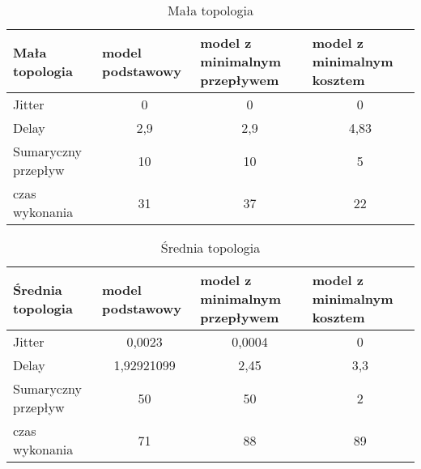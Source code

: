 \begin{table}[!h]
\centering
\caption{Mała topologia}
\label{my-label}
\begin{tabular}{|l|c|c|c|}
\hline
Mała topologia      & \multicolumn{1}{l|}{model podstawowy} & \multicolumn{1}{l|}{model z minimalnym przepływem} & \multicolumn{1}{l|}{model z minimalnym kosztem} \\ \hline
Jitter              & 0                                     & 0                                                  & 0                                               \\ \hline
Delay               & 2,9                                   & 2,9                                                & 4,83                                            \\ \hline
Sumaryczny przepływ & 10                                    & 10                                                 & 5                                               \\ \hline
czas wykonania      & 31                                    & 37                                                 & 22                                              \\ \hline
\end{tabular}
\end{table}

\begin{table}[!h]
\centering
\caption{Średnia topologia}
\label{my-label}
\begin{tabular}{|l|c|c|c|}
\hline
Średnia topologia   & \multicolumn{1}{l|}{model podstawowy} & \multicolumn{1}{l|}{model z minimalnym przepływem} & \multicolumn{1}{l|}{model z minimalnym kosztem} \\ \hline
Jitter              & 0,0023                                & 0,0004                                             & 0                                               \\ \hline
Delay               & 1,92921099                            & 2,45                                               & 3,3                                             \\ \hline
Sumaryczny przepływ & 50                                    & 50                                                 & 2                                               \\ \hline
czas wykonania      & 71                                    & 88                                                 & 89                                              \\ \hline
\end{tabular}
\end{table}

